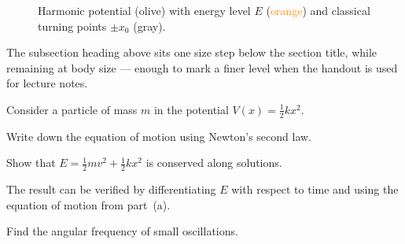 \documentclass[11pt]{article}
\begin{document}
\begin{figure}[ht]
  \centering
  \caption{Harmonic potential (\textcolor{darkolive}{olive}) with energy
           level $E$ (\textcolor{darkorange}{orange}) and classical
           turning points $\pm x_0$ (gray).}
  \label{fig:potential}
\end{figure}

The subsection heading above sits one size step below the section
title, while remaining at body size --- enough to mark a finer level
when the handout is used for lecture notes.


\begin{exercise}
Consider a particle of mass $m$ in the potential
$V(x) = \tfrac{1}{2}kx^2$.

\begin{subproblems}
  \item Write down the equation of motion using Newton's
        second law.
  \item Show that
        $E = \tfrac{1}{2}mv^2 + \tfrac{1}{2}kx^2$
        is conserved along solutions.
\end{subproblems}

The result can be verified by differentiating $E$ with respect
to time and using the equation of motion from part~(a).

\begin{subproblems}[resume]
  \item Find the angular frequency of small oscillations.
\end{subproblems}
\end{exercise}
\end{document}
